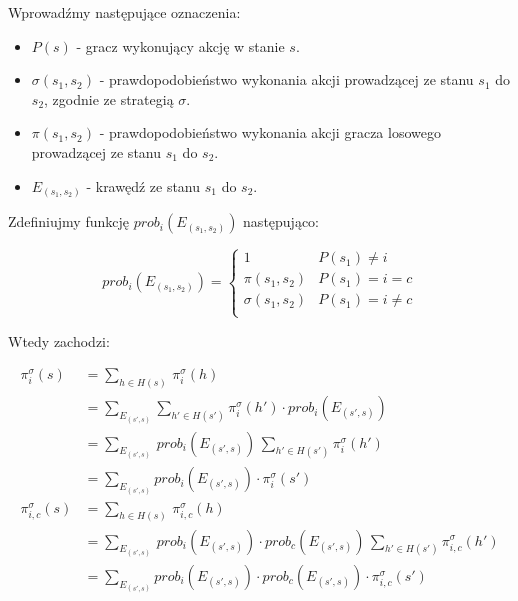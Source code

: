 \documentclass[magisterska]{pracamgr}
\begin{document}
\noindent
Wprowadźmy następujące oznaczenia:

\begin{itemize}
\item $P(s)$ - gracz wykonujący akcję w stanie $s$.
\item $\sigma(s_1, s_2)$ - prawdopodobieństwo wykonania akcji prowadzącej ze stanu $s_1$ do $s_2$, zgodnie ze strategią $\sigma$.
\item $\pi(s_1, s_2)$ - prawdopodobieństwo wykonania akcji gracza losowego prowadzącej ze stanu $s_1$ do $s_2$.
\item $E_{(s_1, s_2)}$ - krawędź ze stanu $s_1$ do $s_2$.
\end{itemize}

\noindent
Zdefiniujmy funkcję $prob_i(E_{(s_1, s_2)})$ następująco:

\begin{equation*}
prob_i(E_{(s_1, s_2)}) = \begin{cases}
                            1                & P(s_1) \neq i     \\
                            \pi(s_1, s_2)    & P(s_1) = i = c    \\
                            \sigma(s_1, s_2) & P(s_1) = i \neq c \\
                          \end{cases}
\end{equation*}

\noindent
Wtedy zachodzi:

\begin{align*}
\pi_i^{\sigma}(s) &= \sum\limits_{h \in H(s)} \, \pi_i^{\sigma}(h) \\
                  &= \sum\limits_{E_{(s', s)}} \sum\limits_{h' \in H(s')} \pi_i^{\sigma}(h') \cdot prob_i(E_{(s', s)}) \\
                  &= \sum\limits_{E_{(s', s)}} \, prob_i(E_{(s', s)}) \, \sum\limits_{h' \in H(s')} \pi_i^{\sigma}(h')  \\
                  &= \sum\limits_{E_{(s', s)}} prob_i(E_{(s', s)}) \cdot \pi_i^{\sigma}(s')\\
\pi_{i, c}^{\sigma}(s) &= \sum\limits_{h \in H(s)} \, \pi_{i, c}^{\sigma}(h) \\
                       &= \sum\limits_{E_{(s', s)}} \, prob_i(E_{(s', s)}) \cdot prob_c(E_{(s', s)}) \, \sum\limits_{h' \in H(s')} \pi_{i, c}^{\sigma}(h') \\
                       &= \sum\limits_{E_{(s', s)}} prob_i(E_{(s', s)}) \cdot prob_c(E_{(s', s)}) \cdot \pi_{i, c}^{\sigma}(s') 
\end{align*}
\end{document}
